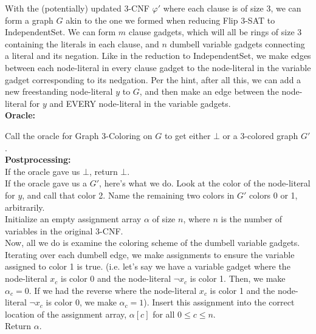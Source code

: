 \documentclass[11pt]{article}
\begin{document}
\begin{enumerate}
\begin{enumerate}
        With the (potentially) updated 3-CNF $\varphi'$ where each clause is of size 3, we can form a graph $G$ akin to the one we formed when reducing Flip 3-SAT to IndependentSet. We can form $m$ clause gadgets, which will all be rings of size 3 containing the literals in each clause, and $n$ dumbell variable gadgets connecting a literal and its negation. Like in the reduction to IndependentSet, we make edges between each node-literal in every clause gadget to the node-literal in the variable gadget corresponding to its nedgation. Per the hint, after all this, we can add a new freestanding node-literal $y$ to $G$, and then make an edge between the node-literal for $y$ and EVERY node-literal in the variable gadgets. \\

        \textbf{Oracle:} 
        
        Call the oracle for Graph 3-Coloring on $G$ to get either $\bot$ or a 3-colored graph $G'$. \\

        \textbf{Postprocessing:} \\

        If the oracle gave us $\bot$, return $\bot$. \\
        
        If the oracle gave us a $G'$, here's what we do. Look at the color of the node-literal for $y$, and call that color 2. Name the remaining two colors in $G'$ colors 0 or 1, arbitrarily. \\

        Initialize an empty assignment array $\alpha$ of size $n$, where $n$ is the number of variables in the original 3-CNF. \\

        Now, all we do is examine the coloring scheme of the dumbell variable gadgets. Iterating over each dumbell edge, we make assignments to ensure the variable assigned to color 1 is true. (i.e. let's say we have a variable gadget where the node-literal $x_c$ is color 0 and the node-literal $\neg x_c$ is color 1. Then, we make $\alpha_c = 0$. If we had the reverse where the node-literal $x_c$ is color 1 and the node-literal $\neg x_c$ is color 0, we make $\alpha_c = 1$). Insert this assignment into the correct location of the assignment array, $\alpha[c]$ for all $0 \leq c \leq n$. \\

        Return $\alpha$. \\


\end{enumerate}
\end{enumerate}
\end{document}
